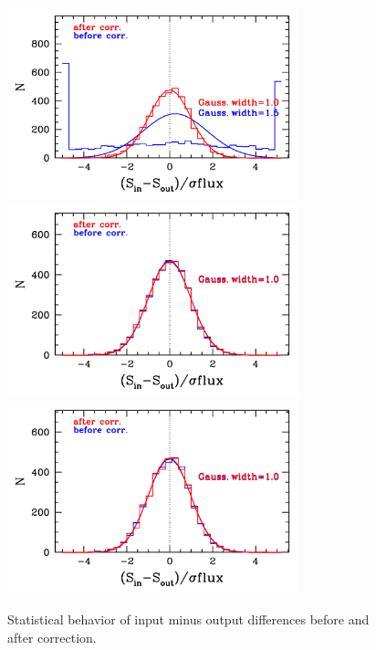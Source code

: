 \documentclass[11pt,a4paper]{article}
\begin{document}
\begin{figure}[H]
	\includegraphics[width=0.75\textwidth]{galsim_20cm_hist_dfcorr_1}
	\includegraphics[width=0.75\textwidth]{galsim_20cm_hist_dfcorr_2}
	\includegraphics[width=0.75\textwidth]{galsim_20cm_hist_dfcorr_3}
	\caption{Statistical behavior of input minus output differences before and after correction.}
\end{figure}


\clearpage

\end{document}
